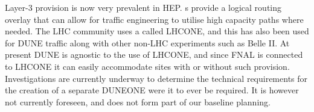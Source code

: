 \documentclass[../main-v1.tex]{subfiles}
\begin{document}
 Layer-3  provision is now very prevalent in HEP. s provide a logical routing overlay that can allow for traffic engineering to utilise high capacity paths where needed. The LHC community uses a  called LHCONE, and this has also been used for DUNE traffic along with other non-LHC experiments such as Belle II. 
At present DUNE is agnostic to the use of LHCONE, and since FNAL is connected to LHCONE it can easily accommodate sites with or without such provision.
Investigations are currently underway to determine the technical requirements for the creation of a separate DUNEONE  were it to ever be required. It is however not currently foreseen, and does not form part of our baseline planning.
\end{document}
